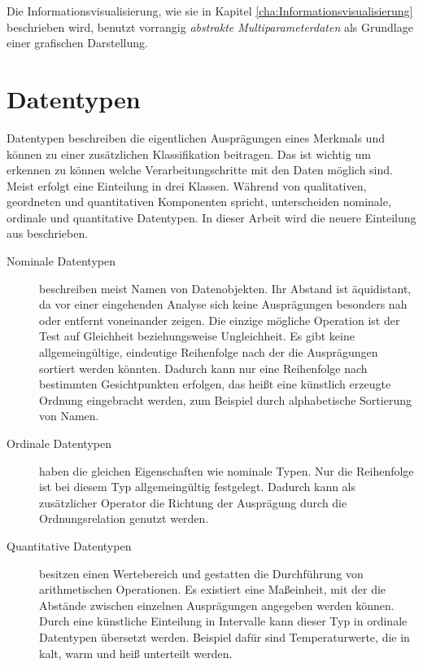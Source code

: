 \documentclass[a4paper, 12pt, DIVcalc, onepage, pdftex, headsepline, footsepline]{scrreprt}
\begin{document}
Die Informationsvisualisierung, wie sie in Kapitel \ref{cha:Informationsvisualisierung} beschrieben wird, benutzt
vorrangig \textit{abstrakte Multiparameterdaten} als Grundlage einer grafischen Darstellung.

\section{Datentypen}
\label{sec:Datentypen}
Datentypen beschreiben die eigentlichen Ausprägungen eines Merkmals und können zu einer zusätzlichen
Klassifikation beitragen. Das ist wichtig um erkennen zu können welche Verarbeitungschritte mit den Daten
möglich sind. Meist erfolgt eine Einteilung in drei Klassen. Während \citep{Bertin} von qualitativen,
geordneten und quantitativen Komponenten spricht, unterscheiden \citep{Preim} nominale, ordinale und
quantitative Datentypen.
In dieser Arbeit wird die neuere Einteilung aus \citep{Preim} beschrieben.
\begin{description}
\item[Nominale Datentypen]
beschreiben meist Namen von Datenobjekten. Ihr Abstand ist äquidistant, da vor einer eingehenden Analyse sich
keine Ausprägungen besonders nah oder entfernt voneinander zeigen. Die einzige mögliche Operation ist der Test auf
Gleichheit beziehungsweise Ungleichheit. Es gibt keine allgemeingültige, eindeutige Reihenfolge
nach der die Ausprägungen sortiert werden könnten. Dadurch kann nur eine Reihenfolge nach bestimmten Gesichtpunkten erfolgen,
das heißt eine künstlich erzeugte Ordnung eingebracht werden, zum Beispiel durch alphabetische Sortierung von Namen.
\item[Ordinale Datentypen]
haben die gleichen Eigenschaften wie nominale Typen.
Nur die Reihenfolge ist bei diesem Typ allgemeingültig festgelegt. Dadurch kann als zusätzlicher Operator die Richtung der
Ausprägung durch die Ordnungsrelation genutzt werden.
\item[Quantitative Datentypen] besitzen einen Wertebereich und gestatten die Durchführung von arithmetischen Operationen. Es existiert eine
Maßeinheit, mit der die Abstände zwischen einzelnen Ausprägungen angegeben werden können. Durch eine 
künstliche Einteilung in Intervalle kann dieser Typ in ordinale Datentypen übersetzt werden. Beispiel
dafür sind Temperaturwerte, die in kalt, warm und heiß unterteilt werden.
\end{description}
\end{document}

